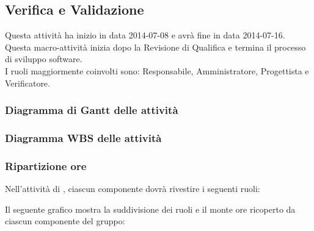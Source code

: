\subsection{Verifica e Validazione}
Questa attività ha inizio in data 2014-07-08 e avrà fine in data 2014-07-16.\\
Questa macro-attività inizia dopo la Revisione di Qualifica e termina il processo di sviluppo software.\\
I ruoli maggiormente coinvolti sono: Responsabile, Amministratore, Progettista e Verificatore.


\subsubsection{Diagramma di Gantt delle attività}

\newpage
\subsubsection{Diagramma WBS delle attività}

\newpage
\subsubsection{Ripartizione ore}

\newpage
Nell'attività di , ciascun componente dovrà rivestire i seguenti ruoli:

Il seguente grafico mostra la suddivisione dei ruoli e il monte ore ricoperto da ciascun componente del gruppo:
